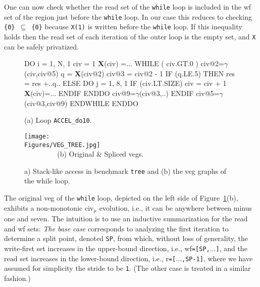 \documentclass[10pt,nocopyrightspace]{sigplanconf}
\newcommand{\mymath}[1]{$ #1 $}
\newcommand{\Figures}[1]{../Figures/}
\begin{document}
One can now check whether the read set of the {\tt while} loop 
is included in the {\sc wf} set of the region just before the
{\tt while} loop. In our case this reduces to checking 
{\tt \{0\} $\subseteq$ \{0\}} because {\tt X(1)} is written 
before the {\tt while} loop.   If this inequality holds then 
the read set of each iteration of the outer loop is the empty 
set, and {\tt X} can be safely privatized. 


\begin{figure}
\begin{minipage}{0.4\columnwidth}
\begin{colorcode}
DO i = 1, N, 1
 civ = 1
 {\bf{}X}(civ) =...
 WHILE ( civ.GT.0 )
  civ@2=\mymath{\gamma}(civ,civ@5)
  q = {\bf X}(civ@2)
  civ@3 = civ@2 - 1
  IF (q.LE.5) THEN
   res = res +..q..
  ELSE
   DO j = 1, 8, 1
    IF (civ.LT.SIZE) 
      civ = civ + 1
      {\bf{}X}(civ)=...
   ENDIF ENDDO
   civ@9=\mymath{\gamma}(civ@3,..)
  ENDIF
  civ@5=\mymath{\gamma}(civ@3,civ@9)
ENDWHILE ENDDO   
\end{colorcode}
\vspace{-1ex}
(a) Loop {\tt ACCEL\_do10}.
\end{minipage}
\begin{minipage}{0.56\columnwidth}
\texttt{[image: \\Figures/VEG\_TREE.jpg]}\\
$\mbox{ }\mbox{ }\mbox{ }\mbox{ }\mbox{ }\mbox{ }\mbox{ }$(b) Original \& Spliced {\sc veg}s.
\end{minipage}
\caption{a) Stack-like access in benchmark {\tt tree} and (b) the {\sc veg} graphs of the while loop.}
\vspace{-1ex}
\label{fig:Tree} %
\end{figure}


The original {\sc veg} of the {\tt while} loop, depicted on the left 
side of Figure~\ref{fig:Tree}(b), exhibits a non-monotonic {\sc civ}$_\mu$
evolution, i.e., it can be anywhere between minus one and seven.
%
The intuition is to use an inductive summarization for the read and {\sc wf} sets:
{\em The base case} corresponds to analyzing the first iteration to determine a split point, 
denoted {\tt SP}, from which, without loss of generality, the write-first set increases in the 
upper-bound direction, i.e., {\sc wf}{\tt=[SP,$\ldots$]}, and the read set increases 
in the lower-bound direction, i.e., {\sc r}{\tt=[$\ldots$,SP-1]}, where we 
have assumed for simplicity the stride to be {\tt 1}.
(The other case is treated in a similar fashion.)
\end{document}
